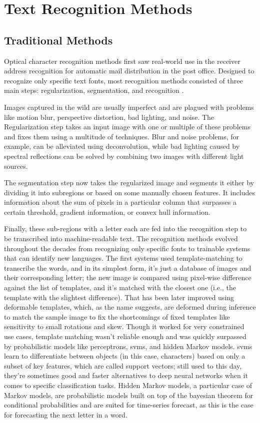 \section{Text Recognition Methods}
\subsection{Traditional Methods}
Optical character recognition methods first saw real-world use in the receiver address recognition for automatic mail distribution in the post office. Designed to recognize only specific text fonts, most recognition methods consisted of three main steps: regularization, segmentation, and recognition \cite{wang_object_2021}.

Images captured in the wild are usually imperfect and are plagued with problems like motion blur, perspective distortion, bad lighting, and noise. The Regularization step takes an input image with one or multiple of these problems and fixes them using a multitude of techniques. Blur and noise problems, for example, can be alleviated using deconvolution, while bad lighting caused by spectral reflections can be solved by combining two images with different light sources.

The segmentation step now takes the regularized image and segments it either by dividing it into subregions or based on some manually chosen features. It includes information about the sum of pixels in a particular column that surpasses a certain threshold, gradient information, or convex hull information.

Finally, these sub-regions with a letter each are fed into the recognition step to be transcribed into machine-readable text. The recognition methods evolved throughout the decades from recognizing only specific fonts to trainable systems that can identify new languages. The first systems used template-matching to transcribe the words, and in its simplest form, it's just a database of images and their corresponding letter; the new image is compared using pixel-wise difference against the list of templates, and it's matched with the closest one (i.e., the template with the slightest difference). That has been later improved using deformable templates, which, as the name suggests, are deformed during inference to match the sample image to fix the shortcomings of fixed templates like sensitivity to small rotations and skew. Though it worked for very constrained use cases, template matching wasn't reliable enough and was quickly surpassed by probabilistic models like perceptrons, \gls{svm}s, and hidden Markov models. \gls{svm}s learn to differentiate between objects (in this case, characters) based on only a subset of key features, which are called support vectors; still used to this day, they're sometimes good and faster alternatives to deep neural networks when it comes to specific classification tasks. Hidden Markov models, a particular case of Markov models, are probabilistic models built on top of the bayesian theorem for conditional probabilities and are suited for time-series forecast, as this is the case for forecasting the next letter in a word.

